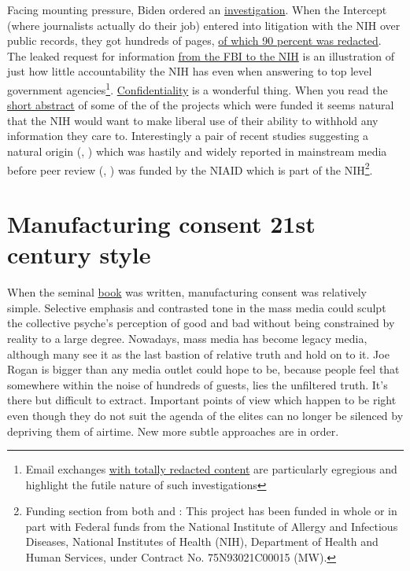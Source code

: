 \documentclass[11pt,a4paper]{article}
\begin{document}
Facing mounting pressure, Biden ordered an \href{https://www.bbc.com/news/world-us-canada-57260009}{investigation}. When the Intercept (where journalists actually do their job) entered into litigation with the NIH over public records, they got hundreds of pages, \href{https://theintercept.com/2022/02/20/nih-coronavirus-research-wuhan-redacted/}{of which 90 percent was redacted}. The leaked request for information \href{https://theintercept.com/2022/01/20/coronavirus-research-china-ecohealth-fbi/}{from the FBI to the NIH} is an illustration of just how little accountability the NIH has even when answering to top level government agencies\footnote{Email exchanges \href{https://www.documentcloud.org/documents/21182424-pages-from-nih_foia_274}{with totally redacted content} are particularly egregious and highlight the futile nature of such investigations}. \href{https://grants.nih.gov/grants/policy/nihgps/html5/section_2/2.3.11_availability_and_confidentiality_of_information.htm}{Confidentiality} is a wonderful thing. When you read the \href{https://reporter.nih.gov/search/-bvPCvB7zkyvb1AjAgW5Yg/project-details/8674931}{short abstract} of some of the of the projects which were funded it seems natural that the NIH would want to make liberal use of their ability to withhold any information they care to. Interestingly a pair of recent studies suggesting a natural origin (\cite{pekar_jonathan_e_2022_6332858}, \cite{michael_worobey_2022_6299116}) which was hastily and widely reported in mainstream media before peer review (\cite{guardian26022022}, \cite{newyorktimes27012022}) was funded by the NIAID which is part of the NIH\footnote{Funding section from both \citet{pekar_jonathan_e_2022_6332858} and \citet{michael_worobey_2022_6299116} : This project has been funded in whole or in part with Federal funds from the National Institute of Allergy and Infectious Diseases, National Institutes of Health (NIH), Department of Health and Human Services, under Contract No. 75N93021C00015 (MW).}.


\section*{Manufacturing consent 21st century style}

When the seminal \href{https://en.wikipedia.org/wiki/Manufacturing_Consent}{book} was written, manufacturing consent was  relatively simple. Selective emphasis and contrasted tone in the mass media could sculpt the collective psyche's perception of good and bad without being constrained by reality to a large degree. Nowadays, mass media has become legacy media, although many see it as the last bastion of relative truth and hold on to it. Joe Rogan is bigger than any media outlet could hope to be, because people feel that somewhere within the noise of hundreds of guests, lies the unfiltered truth. It's there but difficult to extract. Important points of view which happen to be right even though they do not suit the agenda of the elites can no longer be silenced by depriving them of airtime. New more subtle approaches are in order.
\end{document}
